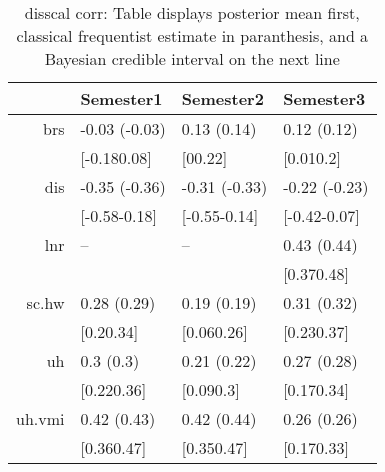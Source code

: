 \begin{table}[ht]
\centering
\begin{tabular}{rlll}
  \hline
 & Semester1 & Semester2 & Semester3 \\ 
  \hline
brs & -0.03 (-0.03) & 0.13 (0.14) & 0.12 (0.12) \\ 
   & [-0.180.08] & [00.22] & [0.010.2] \\ 
  dis & -0.35 (-0.36) & -0.31 (-0.33) & -0.22 (-0.23) \\ 
     & [-0.58-0.18] & [-0.55-0.14] & [-0.42-0.07] \\ 
  lnr & -- & -- & 0.43 (0.44) \\ 
       &  &  & [0.370.48] \\ 
  sc.hw & 0.28 (0.29) & 0.19 (0.19) & 0.31 (0.32) \\ 
         & [0.20.34] & [0.060.26] & [0.230.37] \\ 
  uh & 0.3 (0.3) & 0.21 (0.22) & 0.27 (0.28) \\ 
           & [0.220.36] & [0.090.3] & [0.170.34] \\ 
  uh.vmi & 0.42 (0.43) & 0.42 (0.44) & 0.26 (0.26) \\ 
             & [0.360.47] & [0.350.47] & [0.170.33] \\ 
   \hline
\end{tabular}
\caption{disscal corr: Table displays posterior mean first, classical frequentist estimate in paranthesis, and a Bayesian credible interval on the next line} 
\label{disscal_corr}
\end{table}
